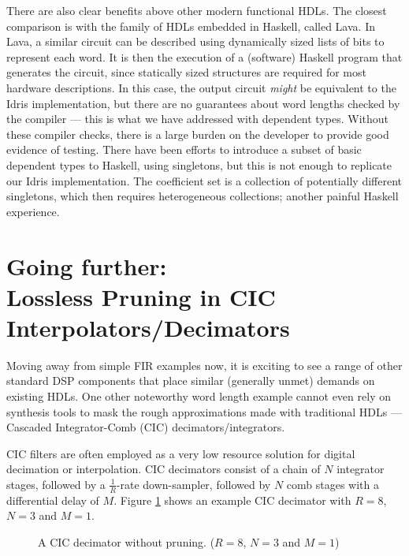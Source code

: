 \documentclass[conference]{IEEEtran}
\begin{document}
There are also clear benefits above other modern functional HDLs. The closest
comparison is with the family of HDLs embedded in Haskell, called
Lava\cite{gill_09}. In Lava, a similar circuit can be described using dynamically
sized lists of bits to represent each word. It is then the execution of a
(software) Haskell program that generates the circuit, since statically sized
structures are required for most hardware descriptions. In this case, the output
circuit \emph{might} be equivalent to the Idris implementation, but there are no
guarantees about word lengths checked by the compiler --- this is what we have
addressed with dependent types. Without these compiler checks, there is a large
burden on the developer to provide good evidence of testing. There have been
efforts to introduce a subset of basic dependent types to Haskell, using
singletons, but this is not enough to replicate our Idris
implementation\cite{lindley_13}. The coefficient set is a collection of
potentially different singletons, which then requires heterogeneous collections;
another painful Haskell experience.

\section{Going further:\\Lossless Pruning in CIC Interpolators/Decimators}

Moving away from simple FIR examples now, it is exciting to see a range of other
standard DSP components that place similar (generally unmet) demands on existing
HDLs. One other noteworthy word length example cannot even rely on synthesis
tools to mask the rough approximations made with traditional HDLs --- Cascaded
Integrator-Comb (CIC) decimators/integrators.

CIC filters are often employed as a very low resource solution for digital
decimation or interpolation. CIC decimators consist of a chain of $N$ integrator
stages, followed by a $\frac{1}{R}$-rate down-sampler, followed by $N$ comb
stages with a differential delay of $M$. Figure \ref{fig:cic} shows an example
CIC decimator with $R=8$, $N=3$ and $M=1$.

\begin{figure}[htb]
  \centering
  \resizebox{\columnwidth}{!}{
    
  }
  \caption{A CIC decimator without pruning. ($R=8$, $N=3$ and $M=1$)}
  \label{fig:cic}
\end{figure}
\end{document}

